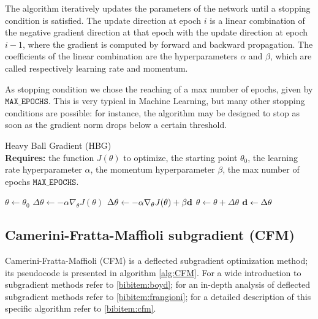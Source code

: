 The algorithm iteratively updates the parameters of the network until a stopping condition is satisfied. The update direction at epoch $i$ is a linear combination of the negative gradient direction at that epoch with the update direction at epoch $i - 1$, where the gradient is computed by forward and backward propagation. The coefficients of the linear combination are the hyperparameters $\alpha$ and $\beta$, which are called respectively learning rate and momentum.

As stopping condition we chose the reaching of a max number of epochs, given by $\texttt{MAX\_EPOCHS}$. This is very typical in Machine Learning, but many other stopping conditions are possible: for instance, the algorithm may be designed to stop as soon as the gradient norm drops below a certain threshold.

\begin{algorithm}[htbp]
    \caption{Heavy Ball Gradient (HBG)\\
        \textbf{Requires:} the function $J(\theta)$ to optimize, the starting point $\theta_0$, the learning rate hyperparameter $\alpha$, the momentum hyperparameter $\beta$, the max number of epochs $\texttt{MAX\_EPOCHS}$.
    }
    \label{alg:HBGD}
    \begin{algorithmic}
        \State $\theta \gets \theta_0$
                \State $\Delta \theta \gets -\alpha \nabla_\theta J(\theta)$
            \Else
                \State $\Delta \theta \gets -\alpha \nabla_\theta J(\theta) + \beta \mathbf{d}$
            \EndIf
            \State $\theta \gets \theta + \Delta \theta$
            \State $\mathbf{d} \gets \Delta \theta$
        \EndFor
    \end{algorithmic}
\end{algorithm}

\subsection{Camerini-Fratta-Maffioli subgradient (CFM)}
Camerini-Fratta-Maffioli (CFM) is a deflected subgradient optimization method; its pseudocode is presented in algorithm \ref{alg:CFM}. For a wide introduction to subgradient methods refer to \ref{bibitem:boyd}; for an in-depth analysis of deflected subgradient methods refer to \ref{bibitem:frangioni}; for a detailed description of this specific algorithm refer to \ref{bibitem:cfm}.

